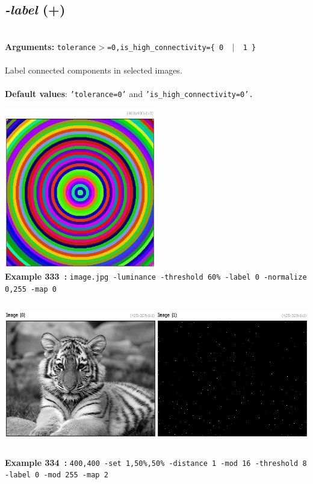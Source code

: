 \documentclass[a4paper,11pt,twoside]{book}
\begin{document}
\subsection{\emph{-label} (+)}\vspace*{-0.5em}
~\\\textbf{Arguments: } 
{\small \texttt{tolerance$>$=0,is\_high\_connectivity=\{ 0 ~$|$~ 1 \}}}\\~\\
Label connected components in selected images.
~\\~\\\textbf{Default values}: {\small \texttt{'tolerance=0'} and \texttt{'is\_high\_connectivity=0'.}}
\begin{center}\includegraphics[keepaspectratio=true,height=7cm,width=\textwidth]{img/gmic_def333.jpg}\\
{\footnotesize \textbf{Example 333~:} \texttt{image.jpg -luminance -threshold 60\% -label 0 -normalize 0,255 -map 0}}
\\\includegraphics[keepaspectratio=true,height=7cm,width=\textwidth]{img/gmic_def334.jpg}\\
{\footnotesize \textbf{Example 334~:} \texttt{400,400 -set 1,50\%,50\% -distance 1 -mod 16 -threshold 8 -label 0 -mod 255 -map 2}}
\end{center}
\end{document}
